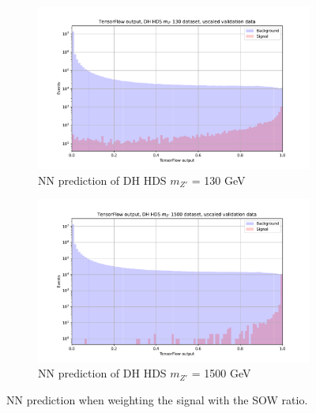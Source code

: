 \documentclass[14pt, a4paper]{book}
\begin{document}
\graphicspath{{../../../Plots/TESTING/NeuralNetwork/BALANCED_WEIGHTING/MC_WGT_SIG_UP/}}
\begin{figure}[!ht]
	\centering
	\begin{subfigure}[b]{0.49\textwidth}
        \centering
        \includegraphics[width=1\textwidth]{DH_HDS_mZp_130/VAL_unscaled.pdf}
        \caption{NN prediction of DH HDS $m_{Z'}$ = 130 GeV}\label{fig:MC_WGT_SIG_DH_HDS_130}
     \end{subfigure}
     \hfill
     \begin{subfigure}[b]{0.49\textwidth}
        \centering
        \includegraphics[width=1\textwidth]{DH_HDS_mZp_1500/VAL_unscaled.pdf}
        \caption{NN prediction of DH HDS $m_{Z'}$ = 1500 GeV}\label{fig:MC_WGT_SIG_DH_HDS_1500}
     \end{subfigure}
     \caption{NN prediction when weighting the signal with the SOW ratio.}\label{fig:MC_WGT_SIG_DH_HDS}
\end{figure}
\graphicspath{{../../../Plots/TESTING/NeuralNetwork/BALANCED_WEIGHTING/MC_EVENTS_SIG_UP/}}
\end{document}
